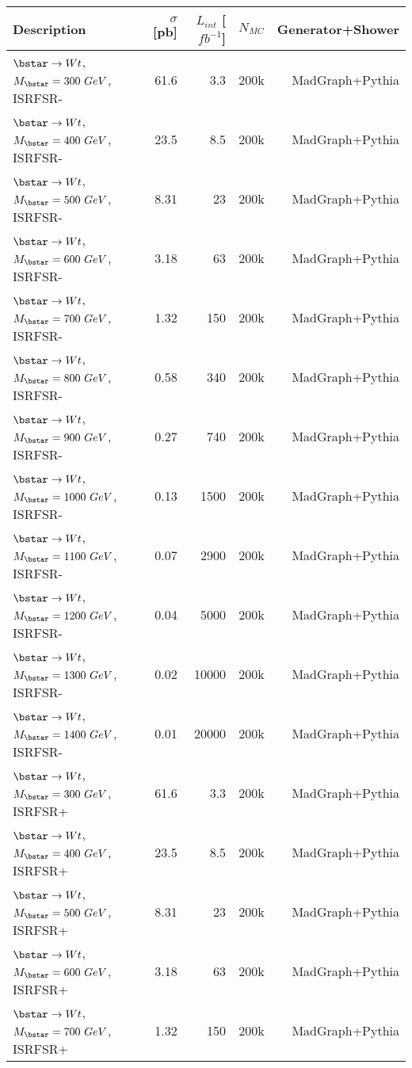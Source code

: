 \begin{table}[htdp]
\begin{center}
\begin{tabular}{lrrrr}
\hline
Description         & $\sigma$ [pb]  & $L_{int}$ [$fb^{-1}$]&  $N_{MC}$& Generator+Shower \\[1mm]
\hline \hline
$\bstar\to Wt$, $M_{\bstar}=300 \ GeV$, ISRFSR- & 61.6 & 3.3 & 200k & MadGraph+Pythia \\[1mm]
$\bstar\to Wt$, $M_{\bstar}=400 \ GeV$, ISRFSR- & 23.5 & 8.5 & 200k & MadGraph+Pythia \\[1mm]
$\bstar\to Wt$, $M_{\bstar}=500 \ GeV$, ISRFSR- & 8.31 & 23 & 200k & MadGraph+Pythia \\[1mm]
$\bstar\to Wt$, $M_{\bstar}=600 \ GeV$, ISRFSR- & 3.18 & 63 & 200k & MadGraph+Pythia \\[1mm]
$\bstar\to Wt$, $M_{\bstar}=700 \ GeV$, ISRFSR- & 1.32 & 150 & 200k & MadGraph+Pythia \\[1mm]
$\bstar\to Wt$, $M_{\bstar}=800 \ GeV$, ISRFSR- & 0.58 & 340 & 200k & MadGraph+Pythia \\[1mm]
$\bstar\to Wt$, $M_{\bstar}=900 \ GeV$, ISRFSR- & 0.27 & 740 & 200k & MadGraph+Pythia \\[1mm]
$\bstar\to Wt$, $M_{\bstar}=1000\ GeV$, ISRFSR- & 0.13 &  1500 & 200k & MadGraph+Pythia \\[1mm]
$\bstar\to Wt$, $M_{\bstar}=1100\ GeV$, ISRFSR- & 0.07 & 2900 & 200k & MadGraph+Pythia \\[1mm]
$\bstar\to Wt$, $M_{\bstar}=1200\ GeV$, ISRFSR- & 0.04 & 5000 & 200k & MadGraph+Pythia \\[1mm]
$\bstar\to Wt$, $M_{\bstar}=1300\ GeV$, ISRFSR- & 0.02 & 10000 & 200k & MadGraph+Pythia \\[1mm]
$\bstar\to Wt$, $M_{\bstar}=1400\ GeV$, ISRFSR- & 0.01 & 20000 & 200k & MadGraph+Pythia \\[1mm]
\hline
$\bstar\to Wt$, $M_{\bstar}=300 \ GeV$, ISRFSR+ & 61.6 & 3.3 & 200k & MadGraph+Pythia \\[1mm]
$\bstar\to Wt$, $M_{\bstar}=400 \ GeV$, ISRFSR+ & 23.5 & 8.5 & 200k & MadGraph+Pythia \\[1mm]
$\bstar\to Wt$, $M_{\bstar}=500 \ GeV$, ISRFSR+ & 8.31 & 23 & 200k & MadGraph+Pythia \\[1mm]
$\bstar\to Wt$, $M_{\bstar}=600 \ GeV$, ISRFSR+ & 3.18 & 63 & 200k & MadGraph+Pythia \\[1mm]
$\bstar\to Wt$, $M_{\bstar}=700 \ GeV$, ISRFSR+ & 1.32 & 150 & 200k & MadGraph+Pythia \\[1mm]

\end{tabular}
\end{center}
\end{table}
